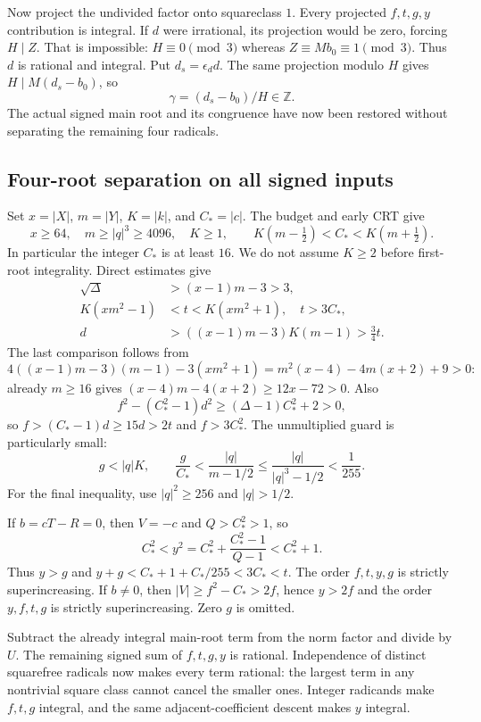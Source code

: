 Now project the undivided factor onto squareclass $1$. Every projected
$f,t,g,y$ contribution is integral. If $d$ were irrational, its projection
would be zero, forcing $H\mid Z$. That is impossible: $H\equiv0\pmod3$
whereas $Z\equiv Mb_0\equiv1\pmod3$. Thus $d$ is rational and integral.
Put $d_s=\epsilon_d d$. The same projection modulo $H$ gives
$H\mid M(d_s-b_0)$, so
\[
 \gamma=(d_s-b_0)/H\in\mathbb Z.
\]
The actual signed main root and its congruence have now been restored
without separating the remaining four radicals.

\subsection{Four-root separation on all signed inputs}

Set $x=|X|$, $m=|Y|$, $K=|k|$, and $C_*=|c|$. The budget and early CRT give
\[
 x\ge64,\quad m\ge|q|^3\ge4096,\quad K\ge1,\qquad
 K(m-\tfrac12)<C_*<K(m+\tfrac12).
\]
In particular the integer $C_*$ is at least $16$. We do not assume
$K\ge2$ before first-root integrality. Direct estimates give
\begin{align*}
 \sqrt\Delta&>(x-1)m-3>3,\\
 K(xm^2-1)&<t<K(xm^2+1),\quad t>3C_*,\\
 d&>((x-1)m-3)K(m-1)>\tfrac34t.
\end{align*}
The last comparison follows from
\[
 4((x-1)m-3)(m-1)-3(xm^2+1)
   =m^2(x-4)-4m(x+2)+9>0:
\]
already $m\ge16$ gives $(x-4)m-4(x+2)\ge12x-72>0$.
Also
\[
 f^2-(C_*^2-1)d^2\ge(\Delta-1)C_*^2+2>0,
\]
so $f>(C_*-1)d\ge15d>2t$ and $f>3C_*^2$.
The unmultiplied guard is particularly small:
\[
 g<|q|K,\qquad
 \frac{g}{C_*}<\frac{|q|}{m-1/2}
       \le\frac{|q|}{|q|^3-1/2}<\frac1{255}.
\]
For the final inequality, use $|q|^2\ge256$ and $|q|>1/2$.

If $b=cT-R=0$, then $V=-c$ and $Q>C_*^2>1$, so
\[
 C_*^2<y^2=C_*^2+\frac{C_*^2-1}{Q-1}<C_*^2+1.
\]
Thus $y>g$ and $y+g<C_*+1+C_*/255<3C_*<t$. The order
$f,t,y,g$ is strictly superincreasing. If $b\ne0$, then
$|V|\ge f^2-C_*>2f$, hence $y>2f$ and the order $y,f,t,g$ is
strictly superincreasing. Zero $g$ is omitted.

Subtract the already integral main-root term from the norm factor and
divide by $U$. The remaining signed sum of $f,t,g,y$ is rational.
Independence of distinct squarefree radicals now makes every term
rational: the largest term in any nontrivial square class cannot cancel
the smaller ones. Integer radicands make $f,t,g$ integral, and the same
adjacent-coefficient descent makes $y$ integral.

